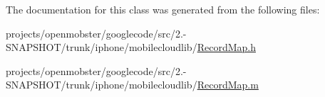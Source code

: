 \-The documentation for this class was generated from the following files\-:\begin{DoxyCompactItemize}
\item 
projects/openmobster/googlecode/src/2.-\/\-S\-N\-A\-P\-S\-H\-O\-T/trunk/iphone/mobilecloudlib/\hyperlink{_record_map_8h}{\-Record\-Map.\-h}\item 
projects/openmobster/googlecode/src/2.-\/\-S\-N\-A\-P\-S\-H\-O\-T/trunk/iphone/mobilecloudlib/\hyperlink{_record_map_8m}{\-Record\-Map.\-m}\end{DoxyCompactItemize}

